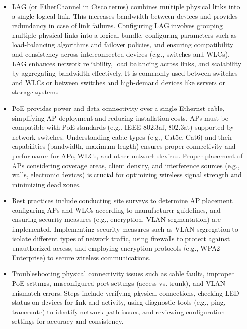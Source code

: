 \documentclass{article}
\begin{document}
\begin{itemize}
	\item[] LAG (or EtherChannel in Cisco terms) combines multiple physical links into a single logical link. This increases bandwidth between devices and provides redundancy in case of link failures. Configuring LAG involves grouping multiple physical links into a logical bundle, configuring parameters such as load-balancing algorithms and failover policies, and ensuring compatibility and consistency across interconnected devices (e.g., switches and WLCs).  LAG enhances network reliability, load balancing across links, and scalability by aggregating bandwidth effectively. It is commonly used between switches and WLCs or between switches and high-demand devices like servers or storage systems.
	\item[] PoE provides power and data connectivity over a single Ethernet cable, simplifying AP deployment and reducing installation costs. APs must be compatible with PoE standards (e.g., IEEE 802.3af, 802.3at) supported by network switches. Understanding cable types (e.g., Cat5e, Cat6) and their capabilities (bandwidth, maximum length) ensures proper connectivity and performance for APs, WLCs, and other network devices. Proper placement of APs considering coverage areas, client density, and interference sources (e.g., walls, electronic devices) is crucial for optimizing wireless signal strength and minimizing dead zones.
	\item[] Best practices include conducting site surveys to determine AP placement, configuring APs and WLCs according to manufacturer guidelines, and ensuring security measures (e.g., encryption, VLAN segmentation) are implemented. Implementing security measures such as VLAN segregation to isolate different types of network traffic, using firewalls to protect against unauthorized access, and employing encryption protocols (e.g., WPA2-Enterprise) to secure wireless communications.
	\item[] Troubleshooting physical connectivity issues such as cable faults, improper PoE settings, misconfigured port settings (access vs. trunk), and VLAN mismatch errors. Steps include verifying physical connections, checking LED status on devices for link and activity, using diagnostic tools (e.g., ping, traceroute) to identify network path issues, and reviewing configuration settings for accuracy and consistency.
  

\end{itemize}
\end{document}
